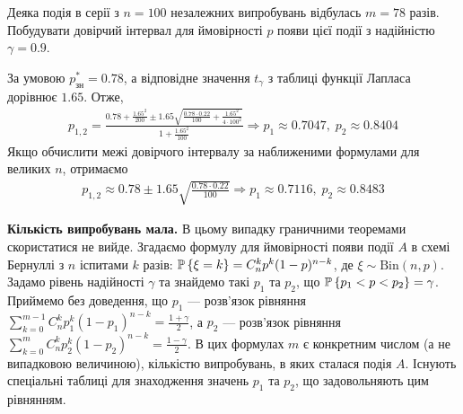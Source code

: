 \begin{example}
    Деяка подія в серії з $n=100$ незалежних випробувань відбулась $m=78$ разів. Побудувати довірчий інтервал для
    ймовірності $p$ появи цієї події з надійністю $\gamma = 0.9$.
    
    За умовою $p^*_{\text{зн}} = 0.78$, а відповідне значення $t_{\gamma}$ з таблиці функції Лапласа дорівнює $1.65$.
    Отже,
    \begin{gather*}
        p_{1, 2} = \frac{0.78 + \frac{1.65^2}{200} \pm 1.65 \sqrt{\frac{0.78\cdot 0.22}{100} + \frac{1.65^2}{4\cdot 100^2}}}{1+\frac{1.65^2}{100}} \Rightarrow
        p_1 \approx 0.7047, \; p_2 \approx 0.8404
    \end{gather*}
    Якщо обчислити межі довірчого інтервалу за наближеними формулами для великих $n$, отримаємо
    \begin{gather*}
        p_{1, 2} \approx 0.78 \pm 1.65\sqrt{\frac{0.78\cdot 0.22}{100}} \Rightarrow p_1 \approx 0.7116, \; p_2 \approx 0.8483
    \end{gather*}
\end{example}

\noindent\textbf{Кількість випробувань мала.} 
В цьому випадку граничними теоремами скористатися не вийде. Згадаємо формулу для ймовірності появи події $A$ в схемі Бернуллі
з $n$ іспитами $k$ разів: 
$\P\left\{ \xi = k\right\} = C_n^k p^k (1-p)^{n-k}$, де $\xi\sim \mathrm{Bin}(n, p)$. 
Задамо рівень надійності $\gamma$ та знайдемо такі $p_1$ та $p_2$, що $\P\left\{p_1 < p < p_2 \right\} = \gamma$.
Приймемо без доведення, що $p_1$ --- розв'язок рівняння 
$\sum\limits_{k=0}^{m-1} C_n^k p_1^k (1-p_1)^{n-k} = \frac{1+\gamma}{2}$, а $p_2$ --- розв'язок рівняння
$\sum\limits_{k=0}^{m} C_n^k p_2^k (1-p_2)^{n-k} = \frac{1-\gamma}{2}$.
В цих формулах $m$ є конкретним числом (а не випадковою величиною), кількістю випробувань, в яких сталася подія $A$.
Існують спеціальні таблиці для знаходження значень $p_1$ та $p_2$, що задовольняють цим рівнянням.

